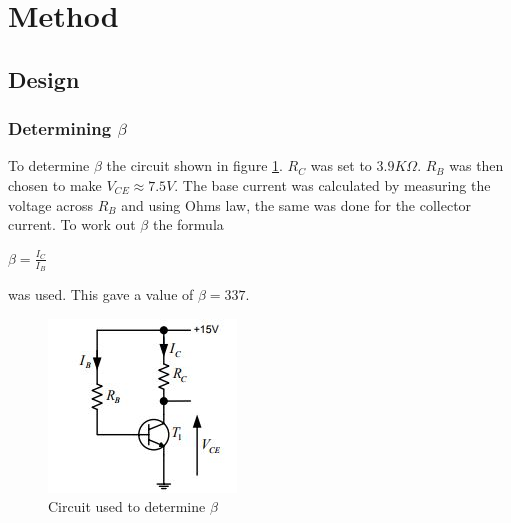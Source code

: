 \documentclass[10pt,a4paper]{article}
\begin{document}
\section{Method}

\subsection{Design}
\subsubsection{Determining $\beta$}
To determine $\beta$ the circuit shown in figure \ref{Beta}. $R_C$ was set to $3.9K\Omega$. $R_B$ was then chosen to make $V_{CE}\approx 7.5V$. The base current was calculated by measuring the voltage across $R_B$ and using Ohms law, the same was done for the collector current. To work out $\beta$ the formula
\begin{center}
\Huge
$\beta = \frac{I_C}{I_B}$
\end{center}
was used. This gave a value of $\beta = 337$.

\begin{figure}[!h]
\includegraphics[scale=0.7]{beta}
\caption{Circuit used to determine $\beta$}
\label{Beta}
\end{figure}
\newpage
\end{document}
